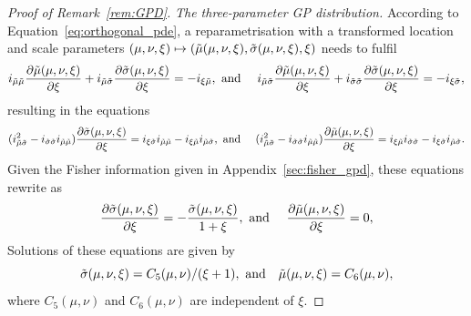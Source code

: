 \documentclass{article}
\newcommand{\1}{\mathds{1}}
\theoremstyle{definition}
\begin{document}
\begin{proof}[Proof of Remark~\ref{rem:GPD}]
\textit{The three-parameter GP distribution.} 
According to Equation~\eqref{eq:orthogonal_pde}, a reparametrisation with a transformed location and scale parameters $(\mu,\nu,\xi)\mapsto(\Tilde{\mu}(\mu,\nu,\xi),\Tilde{\sigma}(\mu,\nu,\xi),\xi)$ needs to fulfil
\begin{equation*}
    i_{\Tilde{\mu} \Tilde{\mu}} \frac{\partial \Tilde{\mu}(\mu,\nu,\xi)}{\partial \xi} + i_{\Tilde{\mu} \Tilde{\sigma}}\frac{\partial \Tilde{\sigma}(\mu,\nu,\xi)}{\partial \xi} = -i_{\xi \Tilde{\mu}} , \mbox{ and }\quad
 i_{\Tilde{\mu} \Tilde{\sigma}} \frac{\partial \Tilde{\mu}(\mu,\nu,\xi)}{\partial \xi} + i_{\Tilde{\sigma}\Tilde{\sigma}}\frac{\partial \Tilde{\sigma}(\mu,\nu,\xi)}{\partial \xi} = -i_{\xi \Tilde{\sigma}},
\end{equation*}
resulting in the equations
\begin{equation*}
    (i_{\Tilde{\mu} \Tilde{\sigma}}^2 - i_{\Tilde{\sigma}\Tilde{\sigma}}i_{\Tilde{\mu} \Tilde{\mu}})\frac{\partial \Tilde{\sigma}(\mu,\nu,\xi)}{\partial \xi} = i_{\xi \Tilde{\sigma}}i_{\Tilde{\mu} \Tilde{\mu}} - i_{\xi \Tilde{\mu}}i_{\Tilde{\mu} \Tilde{\sigma}}, \mbox{ and }\quad
    (i_{\Tilde{\mu} \Tilde{\sigma}}^2 - i_{\Tilde{\sigma}\Tilde{\sigma}}i_{\Tilde{\mu} \Tilde{\mu}})\frac{\partial \Tilde{\mu}(\mu,\nu,\xi)}{\partial \xi} =  i_{\xi \Tilde{\mu}}i_{\Tilde{\sigma}\Tilde{\sigma}} - i_{\xi \Tilde{\sigma}}i_{\Tilde{\mu} \Tilde{\sigma}}.
\end{equation*}
Given the Fisher information given in Appendix~\ref{sec:fisher_gpd}, these equations rewrite as
\begin{equation*}
\frac{\partial\Tilde\sigma(\mu,\nu,\xi)}{\partial \xi} = -\frac{\Tilde\sigma(\mu,\nu,\xi)}{1+\xi}, \mbox{ and }\quad \frac{\partial\Tilde\mu(\mu,\nu,\xi)}{\partial \xi} = 0,
\end{equation*}
Solutions of these equations are given by
\begin{equation*}
\Tilde\sigma(\mu,\nu,\xi) = C_5(\mu,\nu)/(\xi+1), \mbox{ and} \quad \Tilde\mu(\mu,\nu,\xi) = C_6(\mu,\nu),
\end{equation*}
where $C_5(\mu,\nu)$ and $C_6(\mu,\nu)$ are independent of $\xi$.
\end{proof}
\end{document}
